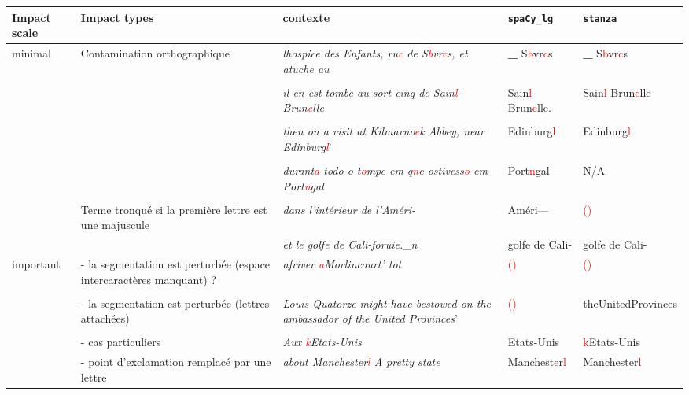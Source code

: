 \begin{tabular}{|p{1.5cm}|p{4cm}|p{4cm}|p{2cm}|p{2cm}|}

\hline


\bf{\small{Impact scale}} &\bf{\small{Impact types}} & \bf {\small{contexte}} &  \bf{\texttt{spaCy\_lg}}&\bf{\texttt{stanza}}\\
\hline
minimal & Contamination orthographique & \textit{lhospice des Enfants, ru\textcolor{red}{c} de S\textcolor{red}{b}vr\textcolor{red}{c}s, et atuche au}& \textbf{\_} S\textcolor{red}{b}vr\textcolor{red}{c}s & \textbf{\_} S\textcolor{red}{b}vr\textcolor{red}{c}s\\
 & &\textit{}&&\\
 
 & & \textit{il en est tombe au sort cinq de Sain\textcolor{red}{l}-Brun\textcolor{red}{c}lle} & Sain\textcolor{red}{l}-Brun\textcolor{red}{c}lle. & Sain\textcolor{red}{l}-Brun\textcolor{red}{c}lle
  \\
 & &\textit{}&&\\
 & & \textit{then on a visit at Kilmarno\textcolor{red}{e}k Abbey, near
Edinburg\textcolor{red}{l}}'& Edinburg\textcolor{red}{l} & Edinburg\textcolor{red}{l} \\
 & &\textit{}&&\\
&&\textit{durant\textcolor{red}{a} todo o t\textcolor{red}{o}mpe
em q\textcolor{red}{n}e ostivess\textcolor{red}{o} em Port\textcolor{red}{n}gal}& Port\textcolor{red}{n}gal & N/A\\ & & & &\\ & Terme tronqué si la première lettre est une majuscule&\textit{dans l'intérieur de l'Améri-} & Améri—& \textcolor{red}{()}\\
&&\small{\textit{et le golfe de Cali-foruie.\_n}}&golfe de Cali-& golfe de Cali-\\
\hline
important & -  la segmentation est perturbée (espace intercaractères manquant) ?& \textit{afriver \textcolor{red}{a}Morlincourt' tot}& \textcolor{red}{()} & \textcolor{red}{()}\\
 & & & &\\ 
 & -  la segmentation est perturbée (lettres attachées) & \textit{Louis Quatorze might have bestowed on the ambassador
of the United Provinces}'& \textcolor{red}{()} &theUnitedProvinces\\& & & &\\
 & - cas particuliers &\textit{Aux \textcolor{red}{k}Etats-Unis}& Etats-Unis & \textcolor{red}{k}Etats-Unis\\
&- point d'exclamation remplacé par une lettre &\textit{about Manchester\textcolor{red}{l} A
pretty state}&Manchester\textcolor{red}{l}&Manchester\textcolor{red}{l}\\







\end{tabular}
